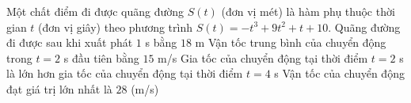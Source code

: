 \begin{ex}%
	Một chất điểm đi được quãng đường $S(t)$ (đơn vị mét) là hàm phụ thuộc thời gian $t$ (đơn vị giây) theo phương trình $S(t)=-t^3+9 t^2+t+10$.
	\choiceTF
	{Quãng đường đi được sau khi xuất phát $1$ s bằng $18$ m}
	{\True Vận tốc trung bình của chuyển động trong $t=2$ s đầu tiên bằng $15$ m/s}
	{\True Gia tốc của chuyển động tại thời điểm $t=2$ s là lớn hơn gia tốc của chuyển động tại thời điểm $t=4$ s}
	{\True Vận tốc của chuyển động đạt giá trị lớn nhất là $28$ (m/s)}
\end{ex}

